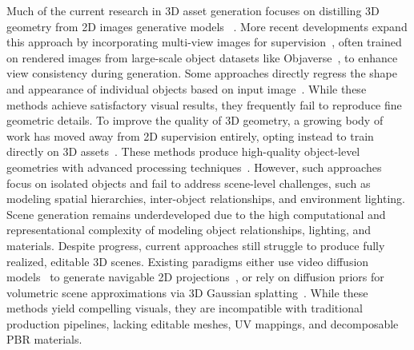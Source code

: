 %
Much of the current research in 3D asset generation focuses on distilling 3D geometry from 2D images generative models ~\cite{poole2022dreamfusion,tang2023dreamgaussian,wang2024prolificdreamer}.  More recent developments expand this approach by incorporating multi-view images for supervision~\cite{liu2023syncdreamer,liu2023zero,liu2024one,voleti2025sv3d,long2024wonder3d,wu2024unique3d}, often trained on rendered images from large-scale object datasets like Objaverse~\cite{deitke2023objaverse}, to enhance view consistency during generation.
Some approaches directly regress the shape and appearance of individual objects based on input image~\cite{hong2023lrm,tang2025lgm}. While these methods achieve satisfactory visual results, they frequently fail to reproduce fine geometric details.
%
To improve the quality of 3D geometry, a growing body of work has moved away from 2D supervision entirely, opting instead to train directly on 3D assets~\cite{deitke2023objaverse,deitke2024objaverse}. These methods produce high-quality object-level geometries with advanced processing techniques~\cite{zhang20233dshape2vecset, zhang2024clay, xiang2024structured}. However, such approaches focus on isolated objects and fail to address scene-level challenges, such as modeling spatial hierarchies, inter-object relationships, and environment lighting.
% 
Scene generation remains underdeveloped due to the high computational and representational complexity of modeling object relationships, lighting, and materials. Despite progress, current approaches still struggle to produce fully realized, editable 3D scenes. Existing paradigms either use video diffusion models~\cite{ho2022video, ho2022imagen, blattmann2023stable} to generate navigable 2D projections~\cite{bruce2024genie, yu2024wonderjourney}, or rely on diffusion priors for volumetric scene approximations via 3D Gaussian splatting~\cite{wu2024reconfusion, gao2024cat3d, liang2024luciddreamer}. While these methods yield compelling visuals, they are incompatible with traditional production pipelines, lacking editable meshes, UV mappings, and decomposable PBR materials.


